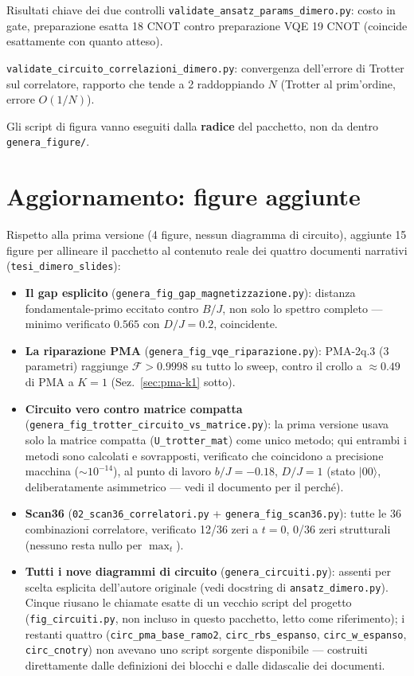 \documentclass[11pt,a4paper]{article}
\newcommand{\ket}[1]{\lvert #1 \rangle}
\newcommand{\code}[1]{\texttt{\small #1}}
\begin{document}
\begin{okbox}{Risultati chiave dei due controlli}
\code{validate\_ansatz\_params\_dimero.py}: costo in gate, preparazione
esatta 18 CNOT contro preparazione VQE 19 CNOT (coincide esattamente
con quanto atteso).

\code{validate\_circuito\_correlazioni\_dimero.py}: convergenza
dell'errore di Trotter sul correlatore, rapporto che tende a 2
raddoppiando $N$ (Trotter al prim'ordine, errore $O(1/N)$).
\end{okbox}

Gli script di figura vanno eseguiti dalla \textbf{radice} del pacchetto,
non da dentro \code{genera\_figure/}.

\section{Aggiornamento: figure aggiunte}
\label{sec:aggiornamento}

Rispetto alla prima versione (4 figure, nessun diagramma di circuito),
aggiunte 15 figure per allineare il pacchetto al contenuto reale dei
quattro documenti narrativi (\texttt{tesi\_dimero\_slides}):

\begin{itemize}[leftmargin=1.4em,itemsep=3pt]
\item \textbf{Il gap esplicito}
(\code{genera\_fig\_gap\_magnetizzazione.py}): distanza
fondamentale-primo eccitato contro $B/J$, non solo lo spettro completo
--- minimo verificato $0.565$ con $D/J=0.2$, coincidente.
\item \textbf{La riparazione PMA}
(\code{genera\_fig\_vqe\_riparazione.py}): PMA-2q.3 (3 parametri)
raggiunge $\mathcal F>0.9998$ su tutto lo sweep, contro il crollo a
$\approx0.49$ di PMA a $K=1$ (Sez.~\ref{sec:pma-k1} sotto).
\item \textbf{Circuito vero contro matrice compatta}
(\code{genera\_fig\_trotter\_circuito\_vs\_matrice.py}): la prima
versione usava solo la matrice compatta (\code{U\_trotter\_mat}) come
unico metodo; qui entrambi i metodi sono calcolati e sovrapposti,
verificato che coincidono a precisione macchina ($\sim10^{-14}$), al
punto di lavoro $b/J=-0.18$, $D/J=1$ (stato $\ket{00}$, deliberatamente
asimmetrico --- vedi il documento per il perché).
\item \textbf{Scan36} (\code{02\_scan36\_correlatori.py} +
\code{genera\_fig\_scan36.py}): tutte le 36 combinazioni correlatore,
verificato 12/36 zeri a $t=0$, 0/36 zeri strutturali (nessuno resta
nullo per $\max_t$).
\item \textbf{Tutti i nove diagrammi di circuito}
(\code{genera\_circuiti.py}): assenti per scelta esplicita
dell'autore originale (vedi docstring di \code{ansatz\_dimero.py}).
Cinque riusano le chiamate esatte di un vecchio script del progetto
(\texttt{fig\_circuiti.py}, non incluso in questo pacchetto, letto come
riferimento); i restanti quattro (\code{circ\_pma\_base\_ramo2},
\code{circ\_rbs\_espanso}, \code{circ\_w\_espanso}, \code{circ\_cnotry})
non avevano uno script sorgente disponibile --- costruiti direttamente
dalle definizioni dei blocchi e dalle didascalie dei documenti.
\end{itemize}
\end{document}
